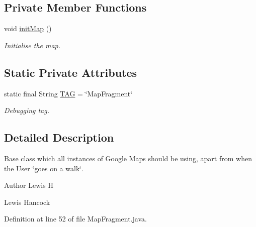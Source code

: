 \subsection*{Private Member Functions}
\begin{DoxyCompactItemize}
\item 
void \hyperlink{classuk_1_1ac_1_1swan_1_1digitaltrails_1_1fragments_1_1_map_fragment_a251d8dcb6c046e55460b9074fb71666f}{init\+Map} ()
\begin{DoxyCompactList}\small\item\em Initialise the map. \end{DoxyCompactList}\end{DoxyCompactItemize}
\subsection*{Static Private Attributes}
\begin{DoxyCompactItemize}
\item 
static final String \hyperlink{classuk_1_1ac_1_1swan_1_1digitaltrails_1_1fragments_1_1_map_fragment_ac5b7b42692d2662bfb1b02f3a9dfb797}{T\+A\+G} = \char`\"{}Map\+Fragment\char`\"{}
\begin{DoxyCompactList}\small\item\em Debugging tag. \end{DoxyCompactList}\end{DoxyCompactItemize}


\subsection{Detailed Description}
Base class which all instances of Google Maps should be using, apart from when the User \char`\"{}goes on a walk\char`\"{}. 

\begin{DoxyAuthor}{Author}
Lewis H 

Lewis Hancock 
\end{DoxyAuthor}


Definition at line 52 of file Map\+Fragment.\+java.




